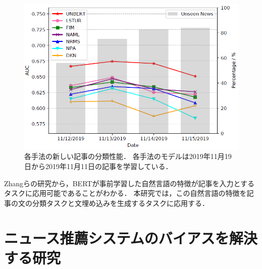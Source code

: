 \documentclass[12pt,a4j]{jreport}
\begin{document}
\begin{figure}[H]
	\centering
	\includegraphics[keepaspectratio, width=120mm]{img/unbert_evaluation.png}
	\caption{
    各手法の新しい記事の分類性能．
    各手法のモデルは2019年11月19日から2019年11月11日の記事を学習している．
    \protect\footnotemark[12]
  }
	\label{fig_unbert_evaluation}
\end{figure}


Zhangらの研究から，BERTが事前学習した自然言語の特徴が記事を入力とするタスクに応用可能であることがわかる．
本研究では，この自然言語の特徴を記事の文の分類タスクと文埋め込みを生成するタスクに応用する．





\section{ニュース推薦システムのバイアスを解決する研究}
\end{document}
